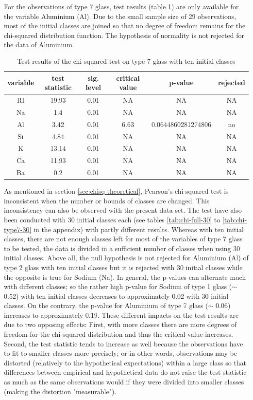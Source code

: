 \documentclass[a4paper, 12pt, titlepage, headsepline, listof = totoc, bibliography = totoc, numbers = noenddot]{scrartcl}
\begin{document}
For the observations of type 7 glass, test results (table \ref{tab:chi-type7}) are only available for the variable Aluminium (Al). Due to the small sample size of 29 observations, most of the initial classes are joined so that no degree of freedom remains for the chi-squared distribution function. The hypothesis of normality is not rejected for the data of Aluminium.

\begin{table}[h!]
\centering
\begin{tabular}{|cccccc|} \hline variable & test statistic & sig. level & critical value & p-value & rejected\\ \hline RI & 19.93 & 0.01 & NA & NA & NA\\ 
Na & 1.4 & 0.01 & NA & NA & NA\\ 
Al & 3.42 & 0.01 & 6.63 & 0.0644860281274806 & no\\ 
Si & 4.84 & 0.01 & NA & NA & NA\\ 
K & 13.14 & 0.01 & NA & NA & NA\\ 
Ca & 11.93 & 0.01 & NA & NA & NA\\ 
Ba & 0.2 & 0.01 & NA & NA & NA\\ \hline \end{tabular}\caption{Test results of the chi-squared test on type 7 glass with ten initial classes}
\label{tab:chi-type7}
\end{table}

As mentioned in section \ref{sec:chisq-theoretical}, Pearson's chi-squared test is inconsistent when the number or bounds of classes are changed. This inconsistency can also be observed with the present data set. The test have also been conducted with 30 initial classes each (see tables \ref{tab:chi-full-30} to \ref{tab:chi-type7-30} in the appendix) with partly different results. Whereas with ten initial classes, there are not enough classes left for most of the variables of type 7 glass to be tested, the data is divided in a sufficient number of classes when using 30 initial classes. Above all, the null hypothesis is not rejected for Aluminium (Al) of type 2 glass with ten initial classes but it is rejected with 30 initial classes while the opposite is true for Sodium (Na). In general, the p-values can alternate much with different classes; so the rather high p-value for Sodium of type 1 glass ($\sim$ 0.52) with ten initial classes decreases to approximately 0.02 with 30 initial classes. On the contrary, the p-value for Aluminium of type 7 glass ($\sim$ 0.06) increases to approximately 0.19. These different impacts on the test results are due to two opposing effects: First, with more classes there are more degrees of freedom for the chi-squared distribution and thus the critical value increases. Second, the test statistic tends to increase as well because the observations have to fit to smaller classes more precisely; or in other words, observations may be distorted (relatively to the hypothetical expectations) within a large class so that differences between empirical and hypothetical data do not raise the test statistic as much as the same observations would if they were divided into smaller classes (making the distortion "measurable").
\end{document}
